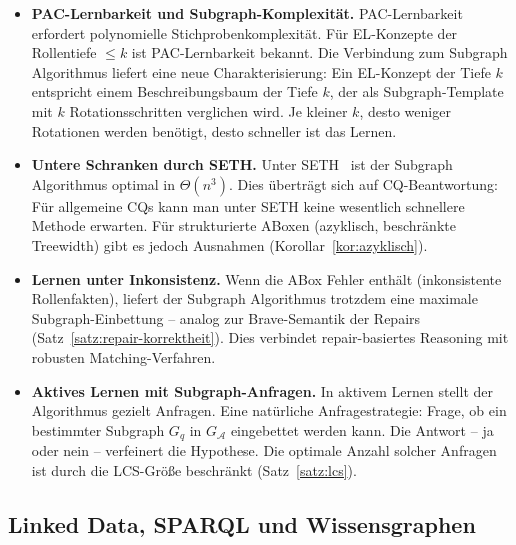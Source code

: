 ﻿\documentclass[a4paper,12pt]{article}
\theoremstyle{definition}
\theoremstyle{plain}
\theoremstyle{remark}
\newcommand{\Abox}{\ensuremath{\mathcal{A}}}
\begin{document}
\begin{itemize}
  \item \textbf{PAC-Lernbarkeit und Subgraph-Komplexit{\"a}t.}
        PAC-Lernbarkeit~\cite{Valiant1984} erfordert polynomielle
        Stichprobenkomplexit{\"a}t. F{\"u}r \textsf{EL}-Konzepte der
        Rollentiefe $\leq k$ ist PAC-Lernbarkeit bekannt.
        Die Verbindung zum Subgraph Algorithmus liefert eine
        neue Charakterisierung: Ein \textsf{EL}-Konzept der Tiefe $k$
        entspricht einem Beschreibungsbaum der Tiefe $k$,
        der als Subgraph-Template mit $k$ Rotationsschritten verglichen wird.
        Je kleiner $k$, desto weniger Rotationen werden ben{\"o}tigt,
        desto schneller ist das Lernen.

  \item \textbf{Untere Schranken durch SETH.}
        Unter SETH~\cite{Epp2026} ist der Subgraph Algorithmus
        optimal in $\Theta(n^3)$. Dies {\"u}bertr{\"a}gt sich auf
        CQ-Beantwortung: F{\"u}r allgemeine CQs kann man unter SETH
        keine wesentlich schnellere Methode erwarten.
        F{\"u}r strukturierte ABoxen (azyklisch, beschr{\"a}nkte Treewidth)
        gibt es jedoch Ausnahmen (Korollar~\ref{kor:azyklisch}).

  \item \textbf{Lernen unter Inkonsistenz.}
        Wenn die ABox Fehler enth{\"a}lt (inkonsistente Rollenfakten),
        liefert der Subgraph Algorithmus trotzdem eine maximale
        Subgraph-Einbettung -- analog zur Brave-Semantik der Repairs
        (Satz~\ref{satz:repair-korrektheit}).
        Dies verbindet repair-basiertes Reasoning mit
        robusten Matching-Verfahren.

  \item \textbf{Aktives Lernen mit Subgraph-Anfragen.}
        In aktivem Lernen stellt der Algorithmus gezielt Anfragen.
        Eine nat{\"u}rliche Anfragestrategie: Frage, ob ein bestimmter
        Subgraph $G_q$ in $G_\Abox$ eingebettet werden kann.
        Die Antwort -- ja oder nein -- verfeinert die Hypothese.
        Die optimale Anzahl solcher Anfragen ist durch die
        LCS-Gr{\"o}{\ss}e beschr{\"a}nkt (Satz~\ref{satz:lcs}).
\end{itemize}

\subsection{Linked Data, SPARQL und Wissensgraphen}
\end{document}
